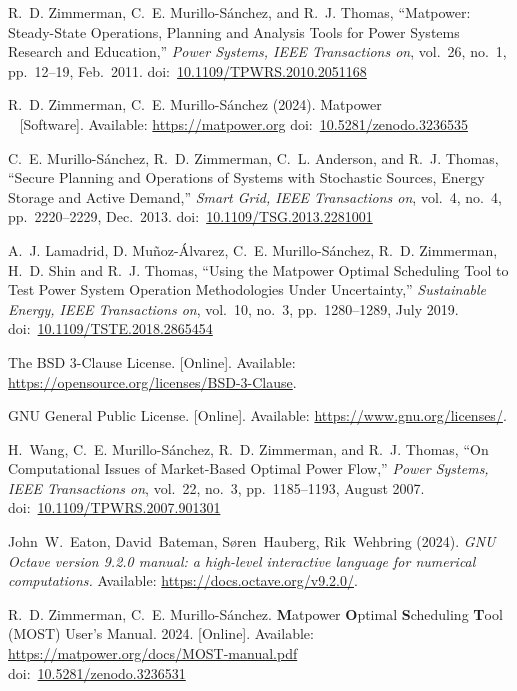 \documentclass[12pt]{article}
\newcommand{\matpower}[0]{{\sc Matpower}}
\newcommand{\most}[0]{{MOST}}
\newcommand{\mostname}[0]{{{\bf M}{\sc atpower} \textbf{O}ptimal \textbf{S}cheduling \textbf{T}ool}}
\newcommand{\currentmostmanurl}[0]{https://matpower.org/docs/MOST-manual.pdf}
\newcommand{\doi}[1]{doi:~\href{https://doi.org/#1}{#1}}
\numberwithin{equation}{section}
\numberwithin{table}{section}
\numberwithin{figure}{section}
\begin{document}
\clearpage
\begin{thebibliography}{99}

R.~D. Zimmerman, C.~E. Murillo-S{\'a}nchez, and R.~J. Thomas, ``\matpower{}: Steady-State Operations, Planning and Analysis Tools for Power Systems Research and Education,'' \emph{Power Systems, IEEE Transactions on}, vol.~26, no.~1, pp.~12--19, Feb.~2011.
\doi{10.1109/TPWRS.2010.2051168}

R.~D. Zimmerman, C.~E. Murillo-S{\'a}nchez (2024). \matpower{}\\~
[Software]. Available: \url{https://matpower.org}
\doi{10.5281/zenodo.3236535}

C.~E. Murillo-S{\'a}nchez, R.~D. Zimmerman, C.~L. Anderson, and R.~J. Thomas, ``Secure Planning and Operations of Systems with Stochastic Sources, Energy Storage and Active Demand,'' \emph{Smart Grid, IEEE Transactions on}, vol.~4, no.~4, pp.~2220--2229, Dec.~2013.
\doi{10.1109/TSG.2013.2281001}

A.~J. Lamadrid, D. Mu{\~n}oz-{\'A}lvarez, C.~E. Murillo-S{\'a}nchez, R.~D. Zimmerman, H.~D. Shin and R.~J. Thomas, ``Using the \matpower{} Optimal Scheduling Tool to Test Power System Operation Methodologies Under Uncertainty,'' \emph{Sustainable Energy, IEEE Transactions on}, vol.~10, no.~3, pp.~1280--1289, July 2019.
\doi{10.1109/TSTE.2018.2865454}

The BSD 3-Clause License. [Online]. Available: \url{https://opensource.org/licenses/BSD-3-Clause}.

GNU General Public License. [Online]. Available: \url{https://www.gnu.org/licenses/}.

H.~Wang, C.~E. Murillo-S{\'a}nchez, R.~D. Zimmerman, and R.~J. Thomas, ``On
Computational Issues of Market-Based Optimal Power Flow,'' \emph{Power
Systems, IEEE Transactions on}, vol.~22, no.~3, pp.~1185--1193, August 2007.
\doi{10.1109/TPWRS.2007.901301}

John~W.~Eaton, David~Bateman, S{\o}ren~Hauberg, Rik~Wehbring (2024). \emph{GNU Octave version 9.2.0 manual: a high-level interactive language for numerical computations.} Available: \url{https://docs.octave.org/v9.2.0/}.

R.~D. Zimmerman, C.~E. Murillo-S{\'a}nchez. \mostname{} (\most{}) User's Manual. 2024. [Online]. Available: \url{\currentmostmanurl}\\
\doi{10.5281/zenodo.3236531}


\end{thebibliography}
\end{document}

